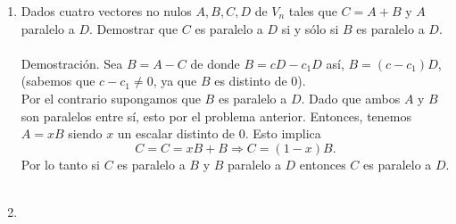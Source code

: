 \begin{enumerate}
\item Dados cuatro vectores no nulos $A,B,C,D$ de $V_n$ tales que $C=A+B$ y $A$ paralelo a $D$. Demostrar que $C$ es paralelo a $D$ si y sólo si $B$ es paralelo a $D$.\\\\
    Demostración.\;  Sea $B=A-C$ de donde $B=cD-c_1D$ así, $B=(c-c_1)D$, (sabemos que $c-c_1\neq 0$, ya que $B$ es distinto de $0$).\\
    Por el contrario supongamos que $B$ es paralelo a $D$. Dado que ambos $A$ y $B$ son paralelos entre sí, esto por el problema anterior. Entonces, tenemos $A=xB$ siendo $x$ un escalar distinto de $0$. Esto implica $$C=C=xB+B \Longrightarrow C = (1-x)B.$$ Por lo tanto si $C$ es paralelo a $B$ y $B$ paralelo a $D$ entonces $C$ es paralelo a $D$.\\\\ 

\item 
\begin{enumerate}[\bfseries a)]
    

\end{enumerate}
\end{enumerate}
